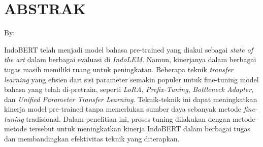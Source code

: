 \clearpage
\chapter*{ABSTRAK}

\begin{center}
    \center
    \begin{singlespace}
        \large\bfseries\MakeUppercase{\thetitle}
    
        \normalfont\normalsize
        By:
    
        \bfseries \theauthor
    \end{singlespace}
\end{center} 


\begin{singlespace}
    IndoBERT telah menjadi model bahasa pre-trained yang diakui sebagai \textit{state of the art} dalam berbagai evaluasi di \textit{IndoLEM}.
    Namun, kinerjanya dalam berbagai tugas masih memiliki ruang untuk peningkatan. 
    Beberapa teknik \textit{transfer learning} yang efisien dari sisi parameter semakin populer 
    untuk fine-tuning model bahasa yang telah di-pretrain, seperti \textit{LoRA}, \textit{Prefix-Tuning}, \textit{Bottleneck Adapter}, dan \textit{Unified Parameter Transfer Learning}. 
    Teknik-teknik ini dapat meningkatkan kinerja model pre-trained tanpa memerlukan sumber daya sebanyak metode \textit{fine-tuning} tradisional. 
    Dalam penelitian ini, proses tuning  dilakukan dengan metode-metode tersebut untuk meningkatkan kinerja IndoBERT dalam berbagai tugas dan membandingkan efektivitas teknik yang diterapkan.
\end{singlespace}
\clearpage

\clearpage
